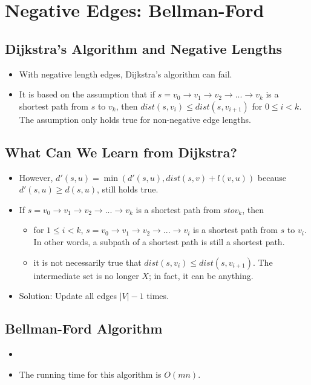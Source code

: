 
\section{Negative Edges: Bellman-Ford}

\subsection{Dijkstra's Algorithm and Negative Lengths}
\begin{itemize}
    \item With negative length edges, Dijkstra's algorithm can fail.
    \item It is based on the assumption that if $s = v_0 \rightarrow v_1 \rightarrow v_2  \rightarrow ... \rightarrow v_k$ is a shortest path from $s$ to $v_k$, then $dist(s, v_i) \leq dist(s, v_{i + 1})$ for $0 \leq i < k$. The assumption only holds true for non-negative edge lengths.
\end{itemize}

\subsection{What Can We Learn from Dijkstra?}
\begin{itemize}
    \item However, $d'(s, u) = \min(d'(s, u), dist(s, v) + l(v, u))$ because $d'(s, u) \geq d(s, u)$, still holds true.
    \item If $s = v_0 \rightarrow v_1 \rightarrow v_2 \rightarrow ... \rightarrow v_k$ is a shortest path from $s to v_k$, then
    \begin{itemize}
        \item for $1 \leq i < k$, $s = v_0 \rightarrow v_1 \rightarrow v_2 \rightarrow ... \rightarrow v_i$ is a shortest path from $s$ to $v_i$. In other words, a subpath of a shortest path is still a shortest path.
        \item it is not necessarily true that $dist(s, v_i) \leq dist(s, v_{i + 1})$. The intermediate set is no longer $X$; in fact, it can be anything.
    \end{itemize}
    \item Solution: Update all edges $\left|V\right| - 1$ times.
\end{itemize}

\subsection{Bellman-Ford Algorithm}
\begin{itemize}
    \item[] 
    \item The running time for this algorithm is $O(mn)$.
\end{itemize}

